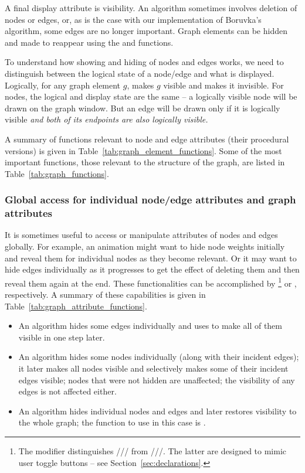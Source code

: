A final display attribute is visibility. An algorithm sometimes involves
deletion of nodes or edges, or, as is the case with our implementation of
Boruvka's algorithm, some edges are no longer important.
Graph elements can be hidden and made to reappear using the  and
 functions.

To understand how showing and hiding of nodes and edges works, we need to
distinguish between the logical state of a node/edge and what is displayed.
Logically, for any graph element $g$,  makes $g$ visible and
 makes it invisible.
For nodes, the logical and display state are the same -- a logically visible
node will be drawn on the graph window.
But an edge will be drawn only if it is logically visible \emph{and both of its
  endpoints are also logically visible.}



A summary of functions relevant to node and edge attributes (their procedural versions)
is given in Table~\ref{tab:graph_element_functions}.
Some of the most important functions, those relevant to the structure of the
graph, are listed in Table~\ref{tab:graph_functions}.

\subsubsection{Global access for individual node/edge attributes and graph attributes}



It is sometimes useful to access or manipulate attributes of nodes and edges
globally.
For example, an animation might want to hide node weights initially
and reveal them for individual nodes as
they become relevant.
Or it may want to hide edges individually as it progresses to get the effect
of deleting them and then reveal them again at the end.
These functionalities can be accomplished by
\footnote{
  The modifier  distinguishes
  ///
  from
  ///.
  The latter are designed to mimic user toggle buttons -- see Section~\ref{sec:declarations}.
}
or , respectively.
A summary of these capabilities is given in Table~\ref{tab:graph_attribute_functions}.

\begin{itemize}
\item An algorithm hides some edges individually and uses  to
  make all of them visible in one step later.
\item An algorithm hides some nodes individually (along with their incident
  edges); it later makes all nodes visible and selectively makes some of
  their incident edges visible; nodes that were not hidden are unaffected;
  the visibility of any edges is not affected either.
\item An algorithm hides individual nodes and edges and later restores
  visibility to the whole graph; the function to use in this case is
  .
\end{itemize}

